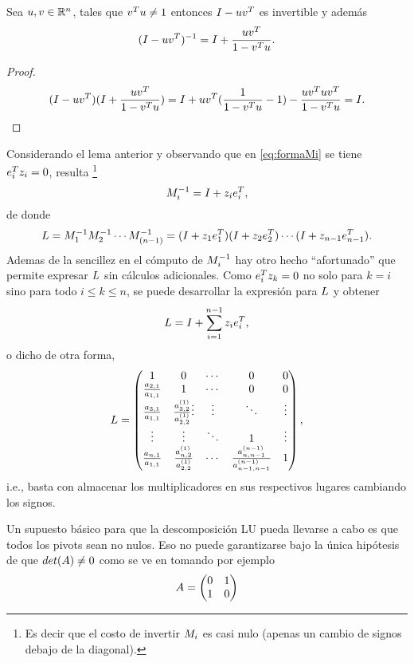 \begin{tcolorbox}
\begin{tcolorbox}[colback=black!15!white,colframe=black!75!black]
\begin{lema}\label{lema:inversamultiplicador}
 Sea $\ub,\vb\in \Rn$, tales que $\vb^T\ub\neq 1$ entonces $\Ib-\ub\vb^T$ es invertible y además
 $$(\Ib-\ub\vb^T)^{-1}=\Ib+\frac{\ub\vb^T}{1-\vb^T\ub}.$$
\end{lema}
\end{tcolorbox}
\begin{proof}
 $$(\Ib-\ub\vb^T)(\Ib+\frac{\ub\vb^T}{1-\vb^T\ub})=\Ib+\ub\vb^T(\frac{1}{1-\vb^T\ub}-1)-\frac{\ub\vb^T\ub\vb^T}{1-\vb^T\ub}=\Ib. $$
\end{proof}
Considerando el lema anterior y observando que en  \eqref{eq:formaMi} se tiene
$\eb_i^T\zb_i=0$, resulta \footnote{Es decir que el costo de invertir $\Mb_i$ es casi nulo (apenas un cambio de signos debajo de la diagonal).}
$$
\Mb_i^{-1}=\Ib+\zb_i\eb_i^T,
$$
de donde
$$
\Lb=\Mb_1^{-1}\Mb_2^{-1}\cdots \Mb_{(n-1)}^{-1}=(\Ib+\zb_1\eb_1^T)(\Ib+\zb_2\eb_2^T)\cdots (\Ib+\zb_{n-1}\eb_{n-1}^T).
$$
Ademas de la sencillez en el cómputo de $\Mb_i^{-1}$ hay otro hecho ``afortunado'' que permite expresar $\Lb$ sin cálculos adicionales. Como $\eb_i^T\zb_k=0$ no solo para $k=i$ sino para todo $i\le k\le n$,  se puede desarrollar la expresión para $\Lb$ y obtener
$$
\Lb=\Ib+\sum_{i=1}^{n-1}\zb_i\eb_i^T,
$$
o dicho de otra forma,
$$
\Lb=
\begin{pmatrix}
1 & 0 & \cdots & 0 & 0\\
\frac{a_{2,1}}{a_{1,1}} & 1 & \cdots & 0 & 0 \\
\frac{a_{3,1}}{a_{1,1}} & \frac{a_{3,2}^{(1)}}{a^{(1)}_{2,2}}
\vdots  & \vdots  & \ddots & \vdots  \\
\vdots  & \vdots  & \ddots &1&  \vdots  \\
\frac{a_{n,1}}{a_{1,1}} &  \frac{a_{n,2}^{(1)}}{a^{(1)}_{2,2}} & \cdots & \frac{a_{n,n-1}^{(n-1)}}{a^{(n-1)}_{n-1,n-1}}& 1
\end{pmatrix},
$$
i.e., basta con almacenar los multiplicadores en sus respectivos lugares cambiando los signos.




Un supuesto básico para que la descomposición LU pueda llevarse a cabo
es que todos los pivots sean no nulos.
Eso no puede garantizarse bajo la única hipótesis de que $det(\Ab)\neq 0$ como se ve en tomando por ejemplo
$$
\Ab=
\begin{pmatrix}
 0&1\\
 1&0
\end{pmatrix}
$$


\end{tcolorbox}
